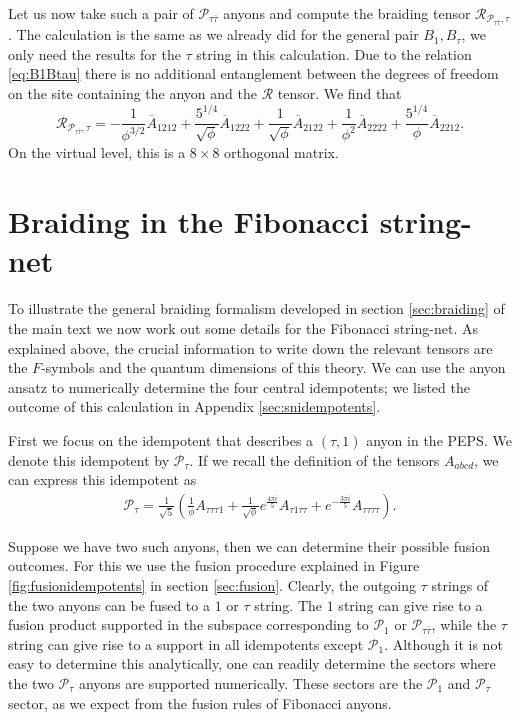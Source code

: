 \documentclass[12 pt]{article}
\begin{document}
Let us now take such a pair of $\mathcal{P}_{\tau\overline{\tau}}$ anyons and compute the braiding tensor $\mathcal{R}_{\mathcal{P}_{\tau\overline{\tau}},\tau}$. The calculation is the same as we already did for the general pair $B_1,B_{\tau}$, we only need the results for the $\tau$ string in this calculation. Due to the relation \eqref{eq:B1Btau} there is no additional entanglement between the degrees of freedom on the site containing the anyon and the $\mathcal{R}$ tensor. We find that
$$
\mathcal{R}_{\mathcal{P}_{\tau\overline{\tau}},\tau}=
-\frac{1}{\phi^{3/2}}\overline{A}_{1212}+\frac{5^{1/4}}{\sqrt{\phi}}\overline{A}_{1222}+\frac{1}{\sqrt{\phi}}\overline{A}_{2122}+\frac{1}{\phi^2}\overline{A}_{2222}+\frac{5^{1/4}}{\phi}\overline{A}_{2212}.
$$
On the virtual level, this is a $8\times 8$ orthogonal matrix.

\section{Braiding in the Fibonacci string-net} \label{app:fibonacci}
To illustrate the general braiding formalism developed in section \ref{sec:braiding} of the main text we now work out some details for the Fibonacci string-net. As explained above, the crucial information to write down the relevant tensors are the $F$-symbols and the quantum dimensions of this theory. We can use the anyon ansatz to numerically determine the four central idempotents; we listed the outcome of this calculation in Appendix \ref{sec:snidempotents}.

First we focus on the idempotent that describes a $(\tau,1)$ anyon in the PEPS. We denote this idempotent by $\mathcal{P}_{\tau}$. If we recall the definition of the tensors $A_{abcd}$, we can express this idempotent as
\begin{align*}
\mathcal{P}_{\tau}=\frac{1}{\sqrt{5}}\left(\frac{1}{\phi}A_{\tau\tau\tau 1}+\frac{1}{\sqrt{\phi}}e^{\frac{4\pi i}{5}}A_{\tau 1\tau\tau}+e^{-\frac{3\pi i}{5}}A_{\tau\tau\tau\tau}\right).
\end{align*}

Suppose we have two such anyons, then we can determine their possible fusion outcomes. For this we use the fusion procedure explained in Figure \ref{fig:fusionidempotents} in section \ref{sec:fusion}. Clearly, the outgoing $\tau$ strings of the two anyons can be fused to a $1$ or $\tau$ string. The $1$ string can give rise to a fusion product supported in the subspace corresponding to $\mathcal{P}_1$ or $\mathcal{P}_{\tau\overline{\tau}}$, while the $\tau$ string can give rise to a support in all idempotents except $\mathcal{P}_1$. Although it is not easy to determine this analytically, one can readily determine the sectors where the two $\mathcal{P}_{\tau}$ anyons are supported numerically. These sectors are the $\mathcal{P}_1$ and $\mathcal{P}_{\tau}$ sector, as we expect from the fusion rules of Fibonacci anyons.
\end{document}
